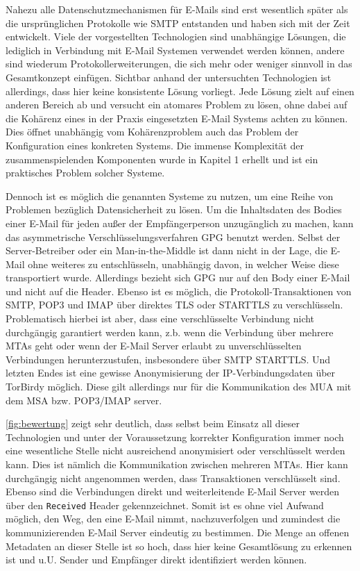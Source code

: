 Nahezu alle Datenschutzmechanismen für E-Mails sind erst wesentlich später als die ursprünglichen Protokolle wie SMTP entstanden und haben sich mit der Zeit entwickelt. Viele der vorgestellten Technologien sind unabhängige Lösungen, die lediglich in Verbindung mit E-Mail Systemen verwendet werden können, andere sind wiederum Protokollerweiterungen, die sich mehr oder weniger sinnvoll in das Gesamtkonzept einfügen. Sichtbar anhand der untersuchten Technologien ist allerdings, dass hier keine konsistente Lösung vorliegt. Jede Lösung zielt auf einen anderen Bereich ab und versucht ein atomares Problem zu lösen, ohne dabei auf die Kohärenz eines in der Praxis eingesetzten E-Mail Systems achten zu können. Dies öffnet unabhängig vom Kohärenzproblem auch das Problem der Konfiguration eines konkreten Systems. Die immense Komplexität der zusammenspielenden Komponenten wurde in Kapitel 1 erhellt und ist ein praktisches Problem solcher Systeme.

Dennoch ist es möglich die genannten Systeme zu nutzen, um eine Reihe von Problemen bezüglich Datensicherheit zu lösen. Um die Inhaltsdaten des Bodies einer E-Mail für jeden außer der Empfängerperson unzugänglich zu machen, kann das asymmetrische Verschlüsselungsverfahren GPG benutzt werden. Selbst der Server-Betreiber oder ein Man-in-the-Middle ist dann nicht in der Lage, die E-Mail ohne weiteres zu entschlüsseln, unabhängig davon, in welcher Weise diese transportiert wurde. Allerdings bezieht sich GPG nur auf den Body einer E-Mail und nicht auf die Header. Ebenso ist es möglich, die Protokoll-Transaktionen von SMTP, POP3 und IMAP über direktes TLS oder STARTTLS zu verschlüsseln. Problematisch hierbei ist aber, dass eine verschlüsselte Verbindung nicht durchgängig garantiert werden kann, z.b. wenn die Verbindung über mehrere MTAs geht oder wenn der E-Mail Server erlaubt zu unverschlüsselten Verbindungen herunterzustufen, insbesondere über SMTP STARTTLS. Und letzten Endes ist eine gewisse Anonymisierung der IP-Verbindungsdaten über TorBirdy möglich. Diese gilt allerdings nur für die Kommunikation des MUA mit dem MSA bzw. POP3/IMAP server.

\autoref{fig:bewertung} zeigt sehr deutlich, dass selbst beim Einsatz all dieser Technologien und unter der Voraussetzung korrekter Konfiguration immer noch eine wesentliche Stelle nicht ausreichend anonymisiert oder verschlüsselt werden kann. Dies ist nämlich die Kommunikation zwischen mehreren MTAs. Hier kann durchgängig nicht angenommen werden, dass Transaktionen verschlüsselt sind. Ebenso sind die Verbindungen direkt und weiterleitende E-Mail Server werden über den \verb#Received# Header gekennzeichnet. Somit ist es ohne viel Aufwand möglich, den Weg, den eine E-Mail nimmt, nachzuverfolgen und zumindest die kommunizierenden E-Mail Server eindeutig zu bestimmen. Die Menge an offenen Metadaten an dieser Stelle ist so hoch, dass hier keine Gesamtlösung zu erkennen ist und u.U. Sender und Empfänger direkt identifiziert werden können.

